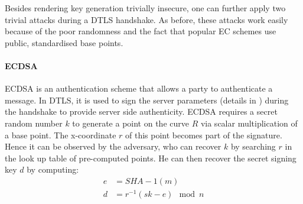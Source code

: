 
% 
Besides rendering key generation trivially insecure, one can further apply two trivial attacks  during a DTLS handshake. As before, these attacks work easily because of the poor randomness and the fact that popular EC schemes use public, standardised base points.

\paragraph{\textbf{ECDSA}}
	ECDSA\cite{ECDSA} is an authentication scheme that allows a party to authenticate a message. In DTLS, it is used to sign the server parameters (details in \cite{rfc3279}) during the handshake to provide server side authenticity. ECDSA requires a secret random number $k$ to generate a point on the curve $R$ via scalar multiplication of a base point. The x-coordinate $r$ of this point becomes part of the signature. Hence it can be observed by the adversary, who can recover $k$ by searching $r$ in the look up table of pre-computed points. He can then recover the secret signing key $d$ by computing:
	\begin{equation}
		\begin{aligned}
		e &= SHA-1(m) \\
		d &= r^{-1}(sk - e) \mod n
		\end{aligned}
	\end{equation}
	
